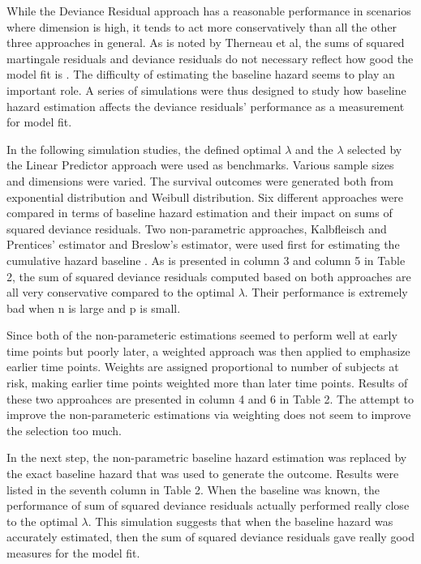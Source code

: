 
\par While the Deviance Residual approach has a reasonable performance in scenarios where dimension is high, it tends to act more conservatively than all the other three approaches in general. As is noted by Therneau et al, the sums of squared martingale residuals and deviance residuals do not necessary reflect how good the model fit is \citep{Therneau2000modeling}. The difficulty of estimating the baseline hazard seems to play an important role. A series of simulations were thus designed to study how baseline hazard estimation affects the deviance residuals' performance as a measurement for model fit. 

\par In the following simulation studies, the defined optimal $\lambda$ and the $\lambda$ selected by the Linear Predictor approach were used as benchmarks. Various sample sizes and dimensions were varied. The survival outcomes were generated both from exponential distribution and Weibull distribution. Six different approaches were compared in terms of baseline hazard estimation and their impact on sums of squared deviance residuals. Two non-parametric approaches, Kalbfleisch and Prentices' estimator and Breslow's estimator, were used first for estimating the cumulative hazard baseline \citep{Kalbfleisch2011} \citep{breslow1972}.  As is presented in column 3 and column 5 in Table 2, the sum of squared deviance residuals computed based on both approaches are all very conservative compared to the optimal $\lambda$. Their performance is extremely bad when n is large and p is small. 

\par Since both of the non-parameteric estimations seemed to perform well at early time points but poorly later, a weighted approach was then applied to emphasize earlier time points. Weights are assigned proportional to number of subjects at risk, making earlier time points weighted more than later time points. Results of these two approahces are presented in column 4 and 6 in Table 2. The attempt to improve the non-parameteric estimations via weighting does not seem to improve the selection too much. 

\par In the next step,  the non-parametric baseline hazard estimation was replaced by the exact baseline hazard that was used to generate the outcome. Results were listed in the seventh column in Table 2. When the baseline was known, the performance of sum of squared deviance residuals actually performed really close to the optimal $\lambda$. This simulation suggests that when the baseline hazard was accurately estimated, then the sum of squared deviance residuals gave really good measures for the model fit.

